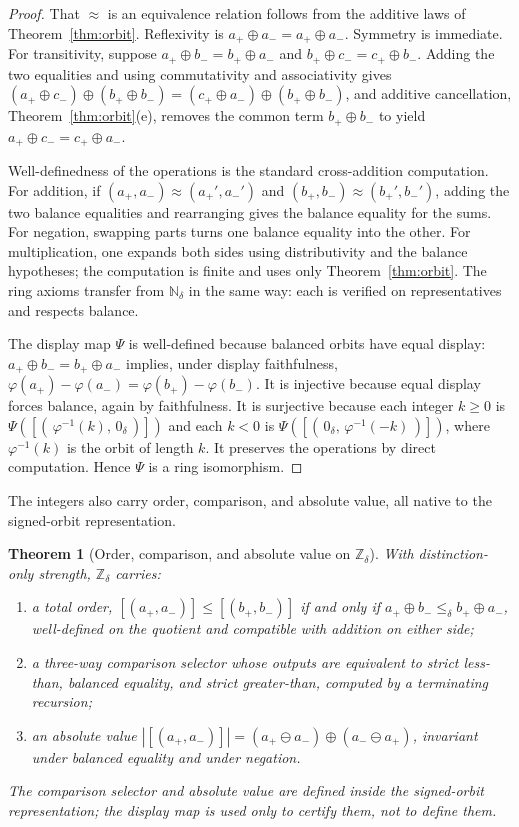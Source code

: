 \documentclass[11pt,a4paper]{article}
\newtheorem{theorem}{Theorem}[section]
\theoremstyle{definition}
\theoremstyle{remark}
\newcommand{\Nd}{\mathbb{N}_\delta}
\newcommand{\Zd}{\mathbb{Z}_\delta}
\newcommand{\zd}{0_\delta}
\newcommand{\oad}{\oplus}
\begin{document}
\begin{proof}
That $\approx$ is an equivalence relation follows from the additive laws of
Theorem~\ref{thm:orbit}. Reflexivity is $a_+ \oad a_- = a_+ \oad a_-$. Symmetry
is immediate. For transitivity, suppose $a_+ \oad b_- = b_+ \oad a_-$ and
$b_+ \oad c_- = c_+ \oad b_-$. Adding the two equalities and using
commutativity and associativity gives
$(a_+ \oad c_-) \oad (b_+ \oad b_-) = (c_+ \oad a_-) \oad (b_+ \oad b_-)$, and
additive cancellation, Theorem~\ref{thm:orbit}(e), removes the common term
$b_+ \oad b_-$ to yield $a_+ \oad c_- = c_+ \oad a_-$.

Well-definedness of the operations is the standard cross-addition computation.
For addition, if $(a_+, a_-) \approx (a_+', a_-')$ and
$(b_+, b_-) \approx (b_+', b_-')$, adding the two balance equalities and
rearranging gives the balance equality for the sums. For negation, swapping
parts turns one balance equality into the other. For multiplication, one expands
both sides using distributivity and the balance hypotheses; the computation is
finite and uses only Theorem~\ref{thm:orbit}. The ring axioms transfer from
$\Nd$ in the same way: each is verified on representatives and respects balance.

The display map $\Psi$ is well-defined because balanced orbits have equal
display: $a_+ \oad b_- = b_+ \oad a_-$ implies, under display faithfulness,
$\varphi(a_+) - \varphi(a_-) = \varphi(b_+) - \varphi(b_-)$. It is injective
because equal display forces balance, again by faithfulness. It is surjective
because each integer $k \geq 0$ is $\Psi([(\,\varphi^{-1}(k),\, \zd\,)])$ and
each $k < 0$ is $\Psi([(\,\zd,\, \varphi^{-1}(-k)\,)])$, where $\varphi^{-1}(k)$
is the orbit of length $k$. It preserves the operations by direct computation.
Hence $\Psi$ is a ring isomorphism.
\end{proof}

The integers also carry order, comparison, and absolute value, all native to
the signed-orbit representation.

\begin{theorem}[Order, comparison, and absolute value on $\Zd$]\label{thm:signedorder}
With distinction-only strength, $\Zd$ carries:
\begin{enumerate}[leftmargin=2em, label=\textup{(\alph*)}]
  \item a total order, $[(a_+, a_-)] \leq [(b_+, b_-)]$ if and only if
    $a_+ \oad b_- \leq_\delta b_+ \oad a_-$, well-defined on the quotient and
    compatible with addition on either side;
  \item a three-way comparison selector whose outputs are equivalent to strict
    less-than, balanced equality, and strict greater-than, computed by a
    terminating recursion;
  \item an absolute value $|[(a_+, a_-)]| = (a_+ \ominus a_-) \oad (a_- \ominus a_+)$,
    invariant under balanced equality and under negation.
\end{enumerate}
The comparison selector and absolute value are defined inside the signed-orbit
representation; the display map is used only to certify them, not to define them.
\end{theorem}
\end{document}

